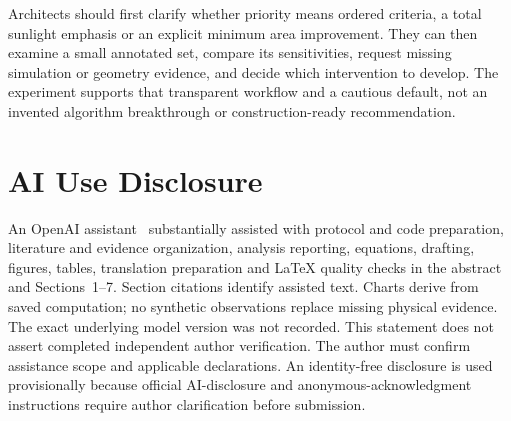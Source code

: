 \documentclass{llncs}
\begin{document}
Architects should first clarify whether priority means ordered criteria, a total sunlight emphasis or an explicit minimum area improvement. They can then examine a small annotated set, compare its sensitivities, request missing simulation or geometry evidence, and decide which intervention to develop. The experiment supports that transparent workflow and a cautious default, not an invented algorithm breakthrough or construction-ready recommendation.

\section*{AI Use Disclosure}
An OpenAI assistant~\cite{openai2026} substantially assisted with protocol and code preparation, literature and evidence organization, analysis reporting, equations, drafting, figures, tables, translation preparation and LaTeX quality checks in the abstract and Sections~1--7. Section citations identify assisted text. Charts derive from saved computation; no synthetic observations replace missing physical evidence. The exact underlying model version was not recorded. This statement does not assert completed independent author verification. The author must confirm assistance scope and applicable declarations. An identity-free disclosure is used provisionally because official AI-disclosure and anonymous-acknowledgment instructions require author clarification before submission.
\FloatBarrier
\end{document}
